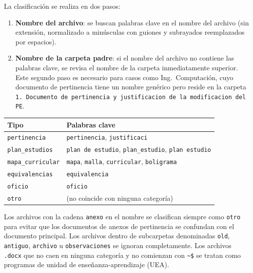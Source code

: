 \documentclass[11pt,a4paper]{article}
\begin{document}
La clasificación se realiza en dos pasos:

\begin{enumerate}[nosep]
  \item \textbf{Nombre del archivo}: se buscan palabras clave en el nombre del archivo
        (sin extensión, normalizado a minúsculas con guiones y subrayados reemplazados
        por espacios).
  \item \textbf{Nombre de la carpeta padre}: si el nombre del archivo no contiene las
        palabras clave, se revisa el nombre de la carpeta inmediatamente superior.
        Este segundo paso es necesario para casos como Ing.\ Computación, cuyo
        documento de pertinencia tiene un nombre genérico pero reside en la carpeta
        \texttt{1.\ Documento de pertinencia y justificacion de la modificacion del PE}.
\end{enumerate}

\begin{center}
\begin{tabular}{lp{8cm}}
\toprule
\textbf{Tipo} & \textbf{Palabras clave} \\
\midrule
\texttt{pertinencia}      & \texttt{pertinencia}, \texttt{justificaci} \\
\texttt{plan\_estudios}   & \texttt{plan de estudio}, \texttt{plan\_estudio}, \texttt{plan estudio} \\
\texttt{mapa\_curricular} & \texttt{mapa}, \texttt{malla}, \texttt{curricular}, \texttt{boligrama} \\
\texttt{equivalencias}    & \texttt{equivalencia} \\
\texttt{oficio}           & \texttt{oficio} \\
\texttt{otro}             & (no coincide con ninguna categoría) \\
\bottomrule
\end{tabular}
\end{center}

\begin{notabox}
Los archivos con la cadena \texttt{anexo} en el nombre se clasifican siempre como
\texttt{otro} para evitar que los documentos de anexos de pertinencia se confundan
con el documento principal. Los archivos dentro de subcarpetas denominadas
\texttt{old}, \texttt{antiguo}, \texttt{archivo} u \texttt{observaciones} se ignoran
completamente. Los archivos \texttt{.docx} que no caen en ninguna categoría y no
comienzan con \texttt{\textasciitilde\$} se tratan como programas de unidad de
enseñanza-aprendizaje (UEA).
\end{notabox}
\end{document}
